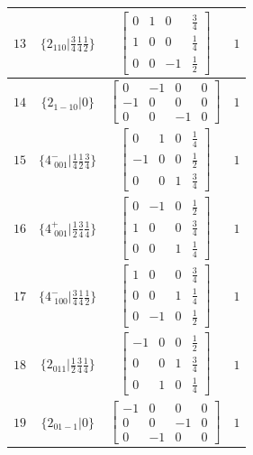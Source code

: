 \documentclass[fleqn,8pt]{jsarticle}
\begin{document}
\begin{longtable}{cccc}
$ 13 $ & $ \{2{}_{110}|\frac{3}{4} \frac{1}{4} \frac{1}{2}\} $ & $ \begin{bmatrix} 0 & 1 & 0 & \frac{3}{4} \\ 1 & 0 & 0 & \frac{1}{4} \\ 0 & 0 & -1 & \frac{1}{2} \end{bmatrix} $ & $ 1 $ \\ \hline
$ 14 $ & $ \{2{}_{1-10}|0\} $ & $ \begin{bmatrix} 0 & -1 & 0 & 0 \\ -1 & 0 & 0 & 0 \\ 0 & 0 & -1 & 0 \end{bmatrix} $ & $ 1 $ \\ \hline
$ 15 $ & $ \{4^{-}_{\,\,001}|\frac{1}{4} \frac{1}{2} \frac{3}{4}\} $ & $ \begin{bmatrix} 0 & 1 & 0 & \frac{1}{4} \\ -1 & 0 & 0 & \frac{1}{2} \\ 0 & 0 & 1 & \frac{3}{4} \end{bmatrix} $ & $ 1 $ \\ \hline
$ 16 $ & $ \{4^{+}_{\,\,001}|\frac{1}{2} \frac{3}{4} \frac{1}{4}\} $ & $ \begin{bmatrix} 0 & -1 & 0 & \frac{1}{2} \\ 1 & 0 & 0 & \frac{3}{4} \\ 0 & 0 & 1 & \frac{1}{4} \end{bmatrix} $ & $ 1 $ \\ \hline
$ 17 $ & $ \{4^{-}_{\,\,100}|\frac{3}{4} \frac{1}{4} \frac{1}{2}\} $ & $ \begin{bmatrix} 1 & 0 & 0 & \frac{3}{4} \\ 0 & 0 & 1 & \frac{1}{4} \\ 0 & -1 & 0 & \frac{1}{2} \end{bmatrix} $ & $ 1 $ \\ \hline
$ 18 $ & $ \{2{}_{011}|\frac{1}{2} \frac{3}{4} \frac{1}{4}\} $ & $ \begin{bmatrix} -1 & 0 & 0 & \frac{1}{2} \\ 0 & 0 & 1 & \frac{3}{4} \\ 0 & 1 & 0 & \frac{1}{4} \end{bmatrix} $ & $ 1 $ \\ \hline
$ 19 $ & $ \{2{}_{01-1}|0\} $ & $ \begin{bmatrix} -1 & 0 & 0 & 0 \\ 0 & 0 & -1 & 0 \\ 0 & -1 & 0 & 0 \end{bmatrix} $ & $ 1 $ \\ \hline

\end{longtable}
\end{document}
